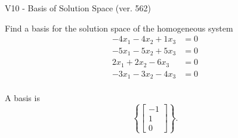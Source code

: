 \begin{exercise}
  \begin{exerciseTitle}V10 - Basis of Solution Space (ver. 562)\end{exerciseTitle}
  \begin{exerciseStatement}
    Find a basis for the solution space of the homogeneous system 
\begin{align*}
 -4 x_ 1 -4 x_ 2 + 1 x_ 3 &= 0  \\ 
  -5 x_ 1 -5 x_ 2 + 5 x_ 3 &= 0  \\ 
  2 x_ 1 + 2 x_ 2 -6 x_ 3 &= 0  \\ 
  -3 x_ 1 -3 x_ 2 -4 x_ 3 &= 0  \\ 
 \end{align*}


 
  \end{exerciseStatement}

  \begin{exerciseAnswer}
   A basis is   
\[\left\{\left[\begin{array}{c}
-1 \\
1 \\
0
\end{array}\right]\right\}.\]

  


  \end{exerciseAnswer}
\end{exercise}